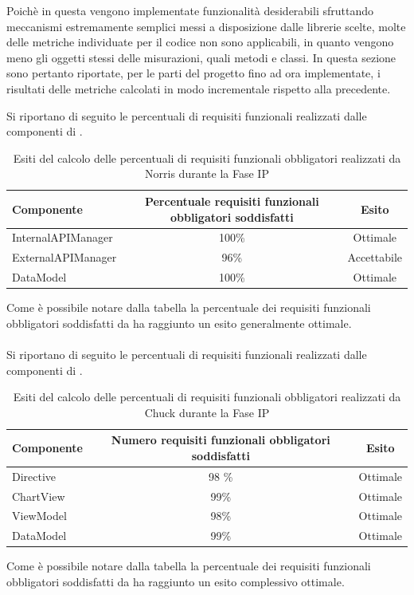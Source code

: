 	Poichè in questa  vengono implementate funzionalità desiderabili sfruttando meccanismi estremamente semplici messi a disposizione dalle librerie scelte, molte delle metriche individuate per il codice non sono applicabili, in quanto vengono meno gli oggetti stessi delle misurazioni, quali metodi e classi.
	In questa sezione sono pertanto riportate, per le parti del progetto fino ad ora implementate, i risultati delle metriche calcolati in modo incrementale rispetto alla  precedente.\\


Si riportano di seguito le percentuali di requisiti funzionali realizzati dalle componenti di .
\begin{table}[H]
	\centering
		\begin{tabu}{| l | c | c |}
			\hline
			Componente	& Percentuale requisiti funzionali obbligatori soddisfatti	& Esito		\\ \hline \hline
			InternalAPIManager	& 100\% 	& Ottimale  \\ \hline
			ExternalAPIManager  & 	96\%	& Accettabile  \\ \hline
			DataModel  & 	100\%	& Ottimale  \\ \hline
		\end{tabu}
	\caption{Esiti del calcolo delle percentuali di requisiti funzionali obbligatori realizzati da Norris durante la Fase IP}
\end{table}
Come è possibile notare dalla tabella la percentuale dei requisiti funzionali obbligatori soddisfatti da  ha raggiunto un esito generalmente ottimale. 
\\ \\
Si riportano di seguito le percentuali di requisiti funzionali realizzati dalle componenti di .
\begin{table}[H]
	\centering
		\begin{tabu}{| l | c | c |}
			\hline
			Componente	& Numero requisiti funzionali obbligatori soddisfatti	& Esito		\\ \hline \hline
			Directive	& 98 \% 	& Ottimale  \\ \hline
			ChartView  & 	99\%	& Ottimale  \\ \hline
			ViewModel  & 	98\%	& Ottimale  \\ \hline
			DataModel  & 	99\%	& Ottimale  \\ \hline
		\end{tabu}
	\caption{Esiti del calcolo delle percentuali di requisiti funzionali obbligatori realizzati da Chuck durante la Fase IP}
\end{table}
Come è possibile notare dalla tabella la percentuale dei requisiti funzionali obbligatori soddisfatti da  ha raggiunto un esito complessivo ottimale.

